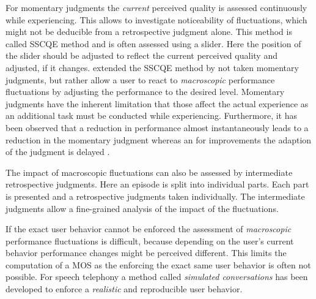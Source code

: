 For momentary judgments the \emph{current} perceived quality is assessed continuously while experiencing.
This allows to investigate noticeability of fluctuations, which might not be deducible from a retrospective judgment alone.
This method is called \ac{SSCQE} method \citep[][p.~137]{weiss_temporal_2014} and is often assessed using a slider.
Here the position of the slider should be adjusted to reflect the current perceived quality and adjusted, if it changes.
\citet{borowiak_long_2013} extended the \ac{SSCQE} method by not taken momentary judgments, but rather allow a user to react to \emph{macroscopic} performance fluctuations by adjusting the performance to the desired level.
Momentary judgments have the inherent limitation that those affect the actual experience as an additional task must be conducted while experiencing.
Furthermore, it has been observed that a reduction in performance almost instantaneously leads to a reduction in the momentary judgment whereas an for improvements the adaption of the judgment is delayed
\cite[\eg,][]{hands_recency_2001, weiss_temporal_2014, hamberg_time-varying_1999}.

The impact of macroscopic fluctuations can also be assessed by intermediate retrospective judgments.
Here an episode is split into individual parts.
Each part is presented and a retrospective judgments taken individually.
The intermediate judgments allow a fine-grained analysis of the impact of the fluctuations.

If the exact user behavior cannot be enforced the assessment of \emph{macroscopic} performance fluctuations is difficult, because depending on the user's current behavior performance changes might be perceived different.
This limits the computation of a \ac{MOS} as the enforcing the exact same user behavior is often not possible.
For speech telephony a method called \emph{simulated conversations} \citep{berger_estimation_2008} has been developed to enforce a \emph{realistic} and reproducible user behavior.

